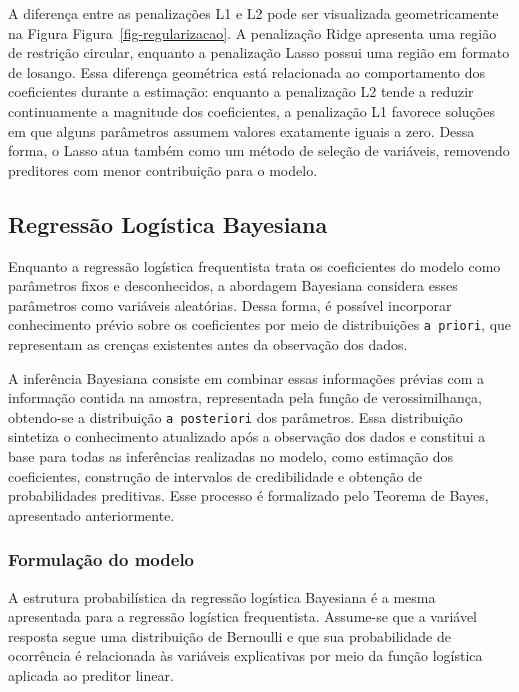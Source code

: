\documentclass[
  brazilian,
  12pt,
  letterpaper,
  DIV=11,
  numbers=noendperiod]{scrartcl}
\begin{document}
A diferença entre as penalizações L1 e L2 pode ser visualizada
geometricamente na Figura Figura~\ref{fig-regularizacao}. A penalização
Ridge apresenta uma região de restrição circular, enquanto a penalização
Lasso possui uma região em formato de losango. Essa diferença geométrica
está relacionada ao comportamento dos coeficientes durante a estimação:
enquanto a penalização L2 tende a reduzir continuamente a magnitude dos
coeficientes, a penalização L1 favorece soluções em que alguns
parâmetros assumem valores exatamente iguais a zero. Dessa forma, o
Lasso atua também como um método de seleção de variáveis, removendo
preditores com menor contribuição para o modelo.

\subsection{Regressão Logística
Bayesiana}\label{regressuxe3o-loguxedstica-bayesiana}

Enquanto a regressão logística frequentista trata os coeficientes do
modelo como parâmetros fixos e desconhecidos, a abordagem Bayesiana
considera esses parâmetros como variáveis aleatórias. Dessa forma, é
possível incorporar conhecimento prévio sobre os coeficientes por meio
de distribuições \texttt{a\ priori}, que representam as crenças
existentes antes da observação dos dados.

A inferência Bayesiana consiste em combinar essas informações prévias
com a informação contida na amostra, representada pela função de
verossimilhança, obtendo-se a distribuição \texttt{a\ posteriori} dos
parâmetros. Essa distribuição sintetiza o conhecimento atualizado após a
observação dos dados e constitui a base para todas as inferências
realizadas no modelo, como estimação dos coeficientes, construção de
intervalos de credibilidade e obtenção de probabilidades preditivas.
Esse processo é formalizado pelo Teorema de Bayes, apresentado
anteriormente.

\subsubsection{Formulação do modelo}\label{formulauxe7uxe3o-do-modelo}

A estrutura probabilística da regressão logística Bayesiana é a mesma
apresentada para a regressão logística frequentista. Assume-se que a
variável resposta segue uma distribuição de Bernoulli e que sua
probabilidade de ocorrência é relacionada às variáveis explicativas por
meio da função logística aplicada ao preditor linear.
\end{document}
